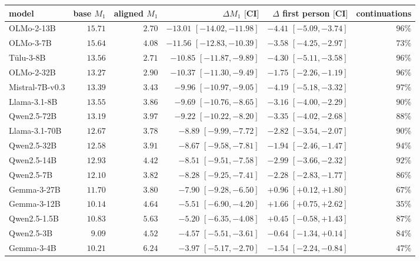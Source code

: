 \begin{center}\scriptsize\setlength{\tabcolsep}{4pt}
\begin{tabular}{lrrrrr}\toprule
model & base $M_1$ & aligned $M_1$ & $\Delta M_1$ $[$CI$]$ & $\Delta$ first person $[$CI$]$ & continuations \\ \midrule
OLMo-2-13B & $15.71$ & $2.70$ & $-13.01$ $[-14.02,-11.98]$ & $-4.41$ $[-5.09,-3.74]$ & $96\%$ \\
OLMo-3-7B & $15.64$ & $4.08$ & $-11.56$ $[-12.83,-10.39]$ & $-3.58$ $[-4.25,-2.97]$ & $73\%$ \\
T\"ulu-3-8B & $13.56$ & $2.71$ & $-10.85$ $[-11.87,-9.89]$ & $-4.30$ $[-5.11,-3.58]$ & $96\%$ \\
OLMo-2-32B & $13.27$ & $2.90$ & $-10.37$ $[-11.30,-9.49]$ & $-1.75$ $[-2.26,-1.19]$ & $96\%$ \\
Mistral-7B-v0.3 & $13.39$ & $3.43$ & $-9.96$ $[-10.97,-9.05]$ & $-4.19$ $[-5.18,-3.32]$ & $97\%$ \\
Llama-3.1-8B & $13.55$ & $3.86$ & $-9.69$ $[-10.76,-8.65]$ & $-3.16$ $[-4.00,-2.29]$ & $90\%$ \\
Qwen2.5-72B & $13.19$ & $3.97$ & $-9.22$ $[-10.22,-8.20]$ & $-3.35$ $[-4.02,-2.68]$ & $88\%$ \\
Llama-3.1-70B & $12.67$ & $3.78$ & $-8.89$ $[-9.99,-7.72]$ & $-2.82$ $[-3.54,-2.07]$ & $90\%$ \\
Qwen2.5-32B & $12.58$ & $3.91$ & $-8.67$ $[-9.58,-7.81]$ & $-1.94$ $[-2.46,-1.47]$ & $94\%$ \\
Qwen2.5-14B & $12.93$ & $4.42$ & $-8.51$ $[-9.51,-7.58]$ & $-2.99$ $[-3.66,-2.32]$ & $92\%$ \\
Qwen2.5-7B & $12.10$ & $3.82$ & $-8.28$ $[-9.25,-7.41]$ & $-2.28$ $[-2.83,-1.77]$ & $86\%$ \\
Gemma-3-27B & $11.70$ & $3.80$ & $-7.90$ $[-9.28,-6.50]$ & $+0.96$ $[+0.12,+1.80]$ & $67\%$ \\
Gemma-3-12B & $10.14$ & $4.64$ & $-5.51$ $[-6.90,-4.20]$ & $+1.66$ $[+0.75,+2.62]$ & $35\%$ \\
Qwen2.5-1.5B & $10.83$ & $5.63$ & $-5.20$ $[-6.35,-4.08]$ & $+0.45$ $[-0.58,+1.43]$ & $87\%$ \\
Qwen2.5-3B & $9.09$ & $4.52$ & $-4.57$ $[-5.51,-3.61]$ & $-0.64$ $[-1.34,+0.14]$ & $84\%$ \\
Gemma-3-4B & $10.21$ & $6.24$ & $-3.97$ $[-5.17,-2.70]$ & $-1.54$ $[-2.24,-0.84]$ & $47\%$ \\
\bottomrule\end{tabular}\end{center}
